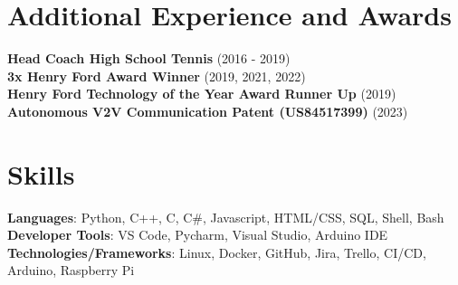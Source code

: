 \documentclass[letterpaper,11pt]{article}
\begin{document}
\section{Additional Experience and Awards}
 \begin{itemize}[leftmargin=0.15in, label={}]
    \small{\item{
     \textbf{Head Coach High School Tennis} {(2016 - 2019)} \\
     \textbf{3x Henry Ford Award Winner} {(2019, 2021, 2022)} \\
     \textbf{Henry Ford Technology of the Year Award Runner Up} {(2019)} \\
     \textbf{Autonomous V2V Communication Patent (US84517399)} {(2023)} \\
    }}
 \end{itemize}

%
\section{Skills}
 \begin{itemize}[leftmargin=0.15in, label={}]
    \small{\item{
     \textbf{Languages}{: Python, C++, C, C\#, Javascript, HTML/CSS, SQL, Shell, Bash} \\
     \textbf{Developer Tools}{: VS Code, Pycharm, Visual Studio, Arduino IDE} \\
     \textbf{Technologies/Frameworks}{: Linux, Docker, GitHub, Jira, Trello, CI/CD, Arduino, Raspberry Pi} \\
    }}
 \end{itemize}
 \vspace{-16pt}
\end{document}
